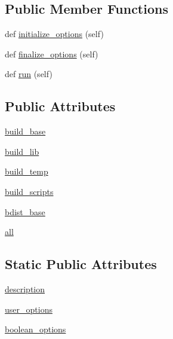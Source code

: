 \subsection*{Public Member Functions}
\begin{DoxyCompactItemize}
\item 
def \hyperlink{classsetuptools_1_1__distutils_1_1command_1_1clean_1_1clean_a1de2569a2ba2e1bc2194ebdbdb2e1276}{initialize\+\_\+options} (self)
\item 
def \hyperlink{classsetuptools_1_1__distutils_1_1command_1_1clean_1_1clean_a25aefcfb183579c29df3bd89b66ed1ad}{finalize\+\_\+options} (self)
\item 
def \hyperlink{classsetuptools_1_1__distutils_1_1command_1_1clean_1_1clean_ade1731978525a34e6cab9b2a6560396d}{run} (self)
\end{DoxyCompactItemize}
\subsection*{Public Attributes}
\begin{DoxyCompactItemize}
\item 
\hyperlink{classsetuptools_1_1__distutils_1_1command_1_1clean_1_1clean_a82d2f4fee6edb5e0ab45ebce2db244d4}{build\+\_\+base}
\item 
\hyperlink{classsetuptools_1_1__distutils_1_1command_1_1clean_1_1clean_ad8a587473b8a806e1b69bc390146bf46}{build\+\_\+lib}
\item 
\hyperlink{classsetuptools_1_1__distutils_1_1command_1_1clean_1_1clean_a0be10ddbe76cb855368bec8dc1a42eb9}{build\+\_\+temp}
\item 
\hyperlink{classsetuptools_1_1__distutils_1_1command_1_1clean_1_1clean_abade6c3d6d2d8123dd176823204fda4e}{build\+\_\+scripts}
\item 
\hyperlink{classsetuptools_1_1__distutils_1_1command_1_1clean_1_1clean_a51e4a97b1bbe34cf023a360445979cc9}{bdist\+\_\+base}
\item 
\hyperlink{classsetuptools_1_1__distutils_1_1command_1_1clean_1_1clean_a370a1a8e468f00704459cea7e4ac001b}{all}
\end{DoxyCompactItemize}
\subsection*{Static Public Attributes}
\begin{DoxyCompactItemize}
\item 
\hyperlink{classsetuptools_1_1__distutils_1_1command_1_1clean_1_1clean_ae1bf8f8f214f3615d3dfdab4fc39d88a}{description}
\item 
\hyperlink{classsetuptools_1_1__distutils_1_1command_1_1clean_1_1clean_a0600f1f4d1f0cc0a4aa4c14540c064d7}{user\+\_\+options}
\item 
\hyperlink{classsetuptools_1_1__distutils_1_1command_1_1clean_1_1clean_a592694e05efd2761b963935684a67a38}{boolean\+\_\+options}
\end{DoxyCompactItemize}


